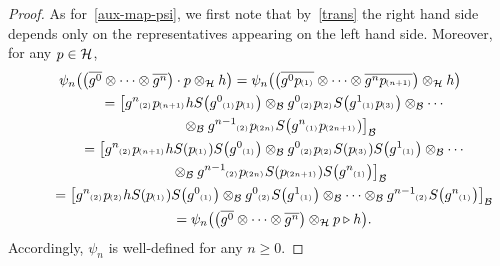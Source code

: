 \documentclass[pdftex]{sigma}
\numberwithin{equation}{section}
\newcommand{\ps}[1]{~\hspace{-4pt}_{^{(#1)}}}
\newcommand{\wbar}[1]{\overline{#1}}
\begin{document}
\begin{proof}
As for~\eqref{aux-map-psi}, we f\/irst note that by~\eqref{trans} the right hand side depends only on the representatives
appearing on the left hand side.
Moreover, for any $p\in{\cal H}$,
\begin{gather*}
\psi_n\big(\big(\wbar{g^0}\otimes\cdots\otimes \wbar{g^n}\big)\cdot p\otimes_{\cal H} h \big)
=\psi_n\big(\big(\wbar{g^0p\ps{1}}\otimes\cdots\otimes \wbar{g^np\ps{n+1}}\big)\otimes_{\cal H} h \big)
\\
\qquad
=\big[g^n\ps{2}p\ps{n+1}hS\big(g^0\ps{1}p\ps{1}\big) \otimes_{\cal B} g^0\ps{2}p\ps{2}S\big(g^1\ps{1}p\ps{3}\big) \otimes_{\cal B} \cdots\\
\qquad\phantom{=}{}
\otimes_{\cal B} g^{n-1}\ps{2}p\ps{2n}S\big(g^n\ps{1}p\ps{2n+1})\big]_{\cal B}
\\
\qquad
=\big[g^n\ps{2}p\ps{n+1}hS(p\ps{1})S\big(g^0\ps{1}\big) \otimes_{\cal B} g^0\ps{2}p\ps{2}S(p\ps{3})S\big(g^1\ps{1}\big) \otimes_{\cal B}
\cdots
\\
\qquad\phantom{=}{}
\otimes_{\cal B} g^{n-1}\ps{2}p\ps{2n}S(p\ps{2n+1})S\big(g^n\ps{1}\big)\big]_{\cal B}
\\
\qquad
=\big[g^n\ps{2}p\ps{2}hS(p\ps{1})S\big(g^0\ps{1}\big) \otimes_{\cal B} g^0\ps{2}S\big(g^1\ps{1}\big) \otimes_{\cal B} \cdots \otimes_{\cal B}
g^{n-1}\ps{2}S\big(g^n\ps{1}\big)\big]_{\cal B}
\\
\qquad
=\psi_n\big(\big(\wbar{g^0}\otimes\cdots\otimes \wbar{g^n}\big)\otimes_{\cal H} p\triangleright h \big).
\end{gather*}
Accordingly, $\psi_n$ is well-def\/ined for any $n\geq 0$.


\end{proof}
\end{document}
